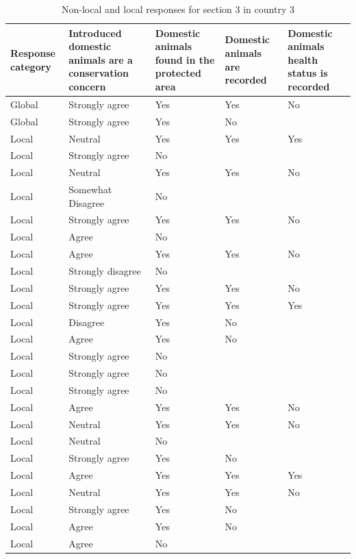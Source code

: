 \documentclass[
  letterpaper,
  DIV=11,
  numbers=noendperiod]{scrartcl}
\begin{document}
\begin{table}[H]

\caption{Non-local and local responses for section 3 in country 3}
\centering
\begin{tabular}[t]{>{\raggedright\arraybackslash}p{2cm}|>{\raggedright\arraybackslash}p{3cm}|>{\raggedright\arraybackslash}p{2cm}|>{\raggedright\arraybackslash}p{2cm}|>{\raggedright\arraybackslash}p{2cm}}
\hline
Response
category & Introduced domestic
animals are
a conservation
concern & Domestic animals
found in the
protected area & Domestic animals
are recorded & Domestic animals
health status
is recorded\\
\hline
Global & Strongly agree & Yes & Yes & No\\
\hline
Global & Strongly agree & Yes & No & \\
\hline
Local & Neutral & Yes & Yes & Yes\\
\hline
Local & Strongly agree & No &  \vphantom{3} & \\
\hline
Local & Neutral & Yes & Yes & \vphantom{2} No\\
\hline
Local & Somewhat Disagree & No &  & \\
\hline
Local & Strongly agree & Yes & Yes & \vphantom{1} No\\
\hline
Local & Agree & No &  \vphantom{1} & \\
\hline
Local & Agree & Yes & Yes & \vphantom{1} No\\
\hline
Local & Strongly disagree & No &  & \\
\hline
Local & Strongly agree & Yes & Yes & No\\
\hline
Local & Strongly agree & Yes & Yes & Yes\\
\hline
Local & Disagree & Yes & No & \\
\hline
Local & Agree & Yes & No \vphantom{1} & \\
\hline
Local & Strongly agree & No &  \vphantom{2} & \\
\hline
Local & Strongly agree & No &  \vphantom{1} & \\
\hline
Local & Strongly agree & No &  & \\
\hline
Local & Agree & Yes & Yes & No\\
\hline
Local & Neutral & Yes & Yes & \vphantom{1} No\\
\hline
Local & Neutral & No &  & \\
\hline
Local & Strongly agree & Yes & No \vphantom{1} & \\
\hline
Local & Agree & Yes & Yes & Yes\\
\hline
Local & Neutral & Yes & Yes & No\\
\hline
Local & Strongly agree & Yes & No & \\
\hline
Local & Agree & Yes & No & \\
\hline
Local & Agree & No &  & \\
\hline
\end{tabular}
\end{table}
\end{document}
